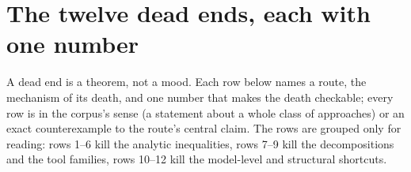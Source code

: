 \section{The twelve dead ends, each with one number}\label{sec:dead}

A dead end is a theorem, not a mood. Each row below names a route, the mechanism of its death,
and one number that makes the death checkable; every row is \LN{} in the corpus's sense (a
statement about a whole class of approaches) or an exact counterexample to the route's central
claim. The rows are grouped only for reading: rows 1--6 kill the analytic inequalities, rows 7--9
kill the decompositions and the tool families, rows 10--12 kill the model-level and structural
shortcuts.

